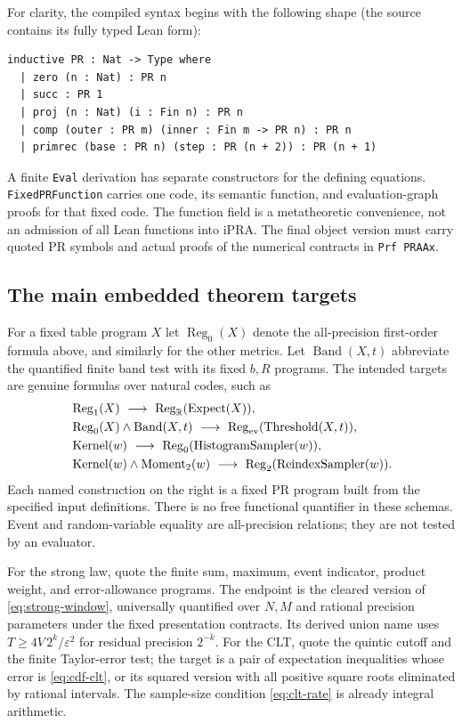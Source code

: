 For clarity, the compiled syntax begins with the following shape (the source
contains its fully typed Lean form):
\begin{lstlisting}
inductive PR : Nat -> Type where
  | zero (n : Nat) : PR n
  | succ : PR 1
  | proj (n : Nat) (i : Fin n) : PR n
  | comp (outer : PR m) (inner : Fin m -> PR n) : PR n
  | primrec (base : PR n) (step : PR (n + 2)) : PR (n + 1)
\end{lstlisting}
A finite \texttt{Eval} derivation has separate constructors for the defining
equations. \texttt{FixedPRFunction} carries one code, its semantic function,
and evaluation-graph proofs for that fixed code. The function field is a
metatheoretic convenience, not an admission of all Lean functions into iPRA.
The final object version must carry quoted PR symbols and actual proofs of
the numerical contracts in \texttt{Prf PRAAx}.

\subsection{The main embedded theorem targets}

For a fixed table program $X$ let $\operatorname{Reg}_0(X)$ denote the
all-precision first-order formula above, and similarly for the other
metrics. Let $\operatorname{Band}(X,t)$ abbreviate the quantified finite
band test with its fixed $b,R$ programs. The intended targets are genuine
formulas over natural codes, such as
\begin{align*}
 &\operatorname{Reg}_1(X)\ \longrightarrow\
   \operatorname{Reg}_{\mathbb R}(\operatorname{Expect}(X)),\\
 &\operatorname{Reg}_0(X)\wedge\operatorname{Band}(X,t)
   \ \longrightarrow\
   \operatorname{Reg}_{\rm ev}(\operatorname{Threshold}(X,t)),\\
 &\operatorname{Kernel}(w)\ \longrightarrow\
   \operatorname{Reg}_0(\operatorname{HistogramSampler}(w)),\\
 &\operatorname{Kernel}(w)\wedge\operatorname{Moment}_2(w)
   \ \longrightarrow\
   \operatorname{Reg}_2(\operatorname{ReindexSampler}(w)).
\end{align*}
Each named construction on the right is a fixed PR program built from the
specified input definitions. There is no free functional quantifier in these
schemas. Event and random-variable equality are all-precision relations;
they are not tested by an evaluator.

For the strong law, quote the finite sum, maximum, event indicator, product
weight, and error-allowance programs. The endpoint is the cleared version of
\eqref{eq:strong-window}, universally quantified over $N,M$ and rational
precision parameters under the fixed presentation contracts. Its derived
union name uses $T\ge4V\,2^k/\varepsilon^2$ for residual precision
$2^{-k}$. For the CLT, quote the quintic cutoff and the finite Taylor-error
test; the target is a pair of expectation inequalities whose error is
\eqref{eq:cdf-clt}, or its squared version with all positive square roots
eliminated by rational intervals. The sample-size condition
\eqref{eq:clt-rate} is already integral arithmetic.

